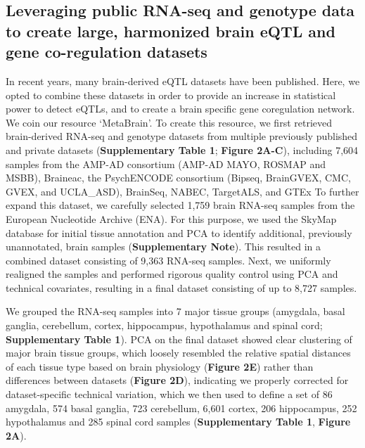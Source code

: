 \subsection{Leveraging public RNA-seq and genotype data to create large, harmonized brain eQTL and gene co-regulation datasets}
In recent years, many brain-derived eQTL datasets have been published. Here, we opted to combine these datasets in order to provide an increase in statistical power to detect eQTLs, and to create a brain specific gene coregulation network. We coin our resource ‘MetaBrain'. To create this resource, we first retrieved brain-derived RNA-seq and genotype datasets from multiple previously published and private datasets (\textbf{Supplementary Table 1}; \textbf{Figure 2A-C}), including 7,604 samples from the AMP-AD consortium\cite{hodesAcceleratingMedicinesPartnership2016} (AMP-AD MAYO\cite{hodesAcceleratingMedicinesPartnership2016}, ROSMAP\cite{hodesAcceleratingMedicinesPartnership2016} and MSBB\cite{hodesAcceleratingMedicinesPartnership2016}), Braineac\cite{ramasamyGeneticVariabilityRegulation2014}, the PsychENCODE consortium\cite{consortium*RevealingBrainMolecular2018} (Bipseq\cite{wangComprehensiveFunctionalGenomic2018}, BrainGVEX\cite{wangComprehensiveFunctionalGenomic2018}, CMC\cite{fromerGeneExpressionElucidates2016}, GVEX, and UCLA\_ASD\cite{wangComprehensiveFunctionalGenomic2018}), BrainSeq\cite{brainseq2015}, NABEC\cite{gibbsAbundantQuantitativeTrait2010}, TargetALS\cite{prudencioDistinctBrainTranscriptome2015}, and GTEx\cite{donovanCellularDeconvolutionGTEx2020} To further expand this dataset, we carefully selected 1,759 brain RNA-seq samples from the European Nucleotide Archive (ENA)\cite{leinonenEuropeanNucleotideArchive2011}. For this purpose, we used the SkyMap\cite{tsuiExtractingAllelicRead2018} database for initial tissue annotation and PCA to identify additional, previously unannotated, brain samples (\textbf{Supplementary Note}). This resulted in a combined dataset consisting of 9,363 RNA-seq samples. Next, we uniformly realigned the samples and performed rigorous quality control using PCA and technical covariates, resulting in a final dataset consisting of up to 8,727 samples.  

We grouped the RNA-seq samples into 7 major tissue groups (amygdala, basal ganglia, cerebellum, cortex, hippocampus, hypothalamus and spinal cord; \textbf{Supplementary Table 1}). PCA on the final dataset showed clear clustering of major brain tissue groups, which loosely resembled the relative spatial distances of each tissue type based on brain physiology (\textbf{Figure 2E}) rather than differences between datasets (\textbf{Figure 2D}), indicating we properly corrected for dataset-specific technical variation, which we then used to define a set of 86 amygdala, 574 basal ganglia, 723 cerebellum, 6,601 cortex, 206 hippocampus, 252 hypothalamus and 285 spinal cord samples (\textbf{Supplementary Table 1}, \textbf{Figure 2A}). 

